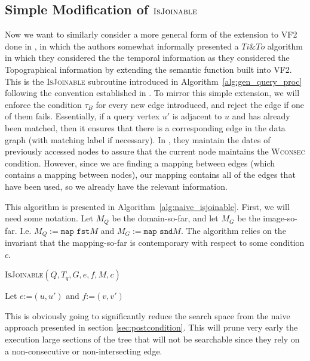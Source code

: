 \subsection{Simple Modification of $\textsc{IsJoinable}$}
\label{sec:naive_joinable}

Now we want to similarly consider a more general form of the extension to VF2
\cite{2004-PAMI-VF2} done in \cite{2016-arXiv-TemporalIso}, in which the authors
somewhat informally presented a $Ti\&To$ algorithm in which they considered the
the temporal information as they considered the Topographical information by
extending the semantic function built into VF2. This is the \textsc{IsJoinable}
subroutine introduced in Algorithm~\ref{alg:gen_query_proc} following the
convention established in \cite{2012-VLDB-IsoSurvey}. To mirror this simple
extension, we will enforce the condition $\tau_B$ for every new edge introduced,
and reject the edge if one of them fails. Essentially, if a query vertex $u'$ is
adjacent to $u$ and has already been matched, then it ensures that there is a
corresponding edge in the data graph (with matching label if necessary). In
\cite{2004-PAMI-VF2}, they maintain the dates of previously accessed nodes to
assure that the current node maintains the \textsc{Wconsec} condition. However,
since we are finding a mapping between edges (which contains a mapping between
nodes), our mapping contains all of the edges that have been used, so we already
have the relevant information.

This algorithm is presented in Algorithm~\ref{alg:naive_isjoinable}. First, we
will need some notation. Let $M_Q$ be the domain-so-far, and let $M_G$ be the
image-so-far. I.e. $M_Q := \texttt{map fst} M$ and $M_G := \texttt{map snd} M$.
The algorithm relies on the invariant that the mapping-so-far is contemporary
with respect to some condition $c$.

\begin{algorithm}
  \label{alg:naive_isjoinable}
  \caption{\textsc{IsJoinable}$(Q,T_q,G,e,f,M,c)$}
  
  Let $e \texttt{:=} (u,u')$ and $f \texttt{:=} (v,v')$\;
  
\end{algorithm}


This is obviously going to significantly reduce the search space from the naive
approach presented in section \ref{sec:postcondition}. This will prune very
early the execution large sections of the tree that will not be searchable since
they rely on a non-consecutive or non-intersecting edge.
